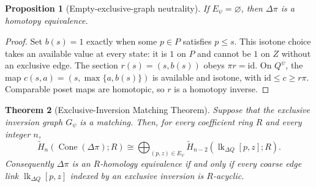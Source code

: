 \documentclass[11pt]{article}
\newtheorem{theorem}{Theorem}[section]
\newtheorem{proposition}[theorem]{Proposition}
\newcommand{\Cone}{\operatorname{Cone}}
\begin{document}
\begin{proposition}[Empty-exclusive-graph neutrality]
\label{prop:empty-exclusive}
If $E_\psi=\varnothing$, then $\Delta\pi$ is a homotopy equivalence.
\end{proposition}
\begin{proof}
Set $b(s)=1$ exactly when some $p\in P$ satisfies $p\le s$.
This isotone choice takes an available value at every state: it is $1$ on $P$
and cannot be $1$ on $Z$ without an exclusive edge.  The section
$r(s)=(s,b(s))$ obeys $\pi r=\mathrm{id}$.
On $Q^\psi$, the map $c(s,a)=(s,\max\{a,b(s)\})$ is available and isotone,
with $\mathrm{id}\le c\ge r\pi$.  Comparable poset maps are homotopic,
so $r$ is a homotopy inverse.
\end{proof}

\begin{theorem}[Exclusive-Inversion Matching Theorem]
\label{thm:exclusive-matching}
Suppose that the exclusive inversion graph $G_\psi$ is a matching.  Then, for
every coefficient ring $R$ and every integer $n$,
\begin{equation}
\widetilde H_n\!\left(\Cone(\Delta\pi);R\right)
\cong
\bigoplus_{(p,z)\in E_\psi}
\widetilde H_{n-2}\!\left(
\operatorname{lk}_{\Delta Q}[p,z];R
\right).
\label{eq:exclusive-matching}
\end{equation}
Consequently $\Delta\pi$ is an $R$-homology equivalence if and only if every
coarse edge link $\operatorname{lk}_{\Delta Q}[p,z]$ indexed by an exclusive
inversion is $R$-acyclic.
\end{theorem}
\end{document}
